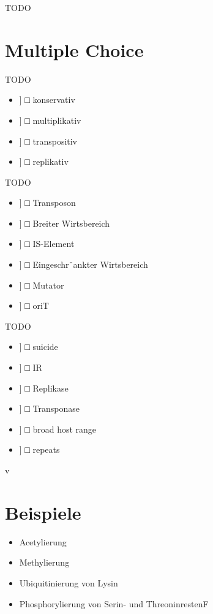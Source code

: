 TODO

\section{Multiple Choice}
TODO
\begin{itemize}
    \item[[ ]] □ konservativ
\item[[ ]] □ multiplikativ
\item[[ ]] □ transpositiv
\item[[ ]] □ replikativ
\end{itemize}
TODO
\begin{itemize}
    \item[[ ]] □ Transposon
    \item[[ ]] □ Breiter Wirtsbereich
    \item[[ ]] □ IS-Element
    \item[[ ]] □ Eingeschr¨ankter Wirtsbereich
    \item[[ ]] □ Mutator
    \item[[ ]] □ oriT
\end{itemize}
TODO
\begin{itemize}
    \item[[ ]] □ suicide
    \item[[ ]] □ IR
    \item[[ ]] □ Replikase
    \item[[ ]] □ Transponase
    \item[[ ]] □ broad host range
    \item[[ ]] □ repeats
\end{itemize}v

\section{Beispiele}
\begin{itemize}
    \item Acetylierung
    \item Methylierung
    \item Ubiquitinierung von Lysin
    \item Phosphorylierung von Serin- und ThreoninrestenF
\end{itemize} $\ $ \\

